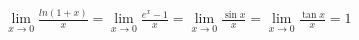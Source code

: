 \documentclass[preview]{standalone}
\begin{document}
\begin{align*}
\lim_{ x \to 0}\frac{ln(1+x)}{x}=\lim_{ x \to 0}\frac{e^x-1}{x}=\lim_{ x \to 0}\frac{\sin{x}}{x}=\lim_{ x \to 0}\frac{\tan{x}}{x}=1
\end{align*}
\end{document}
